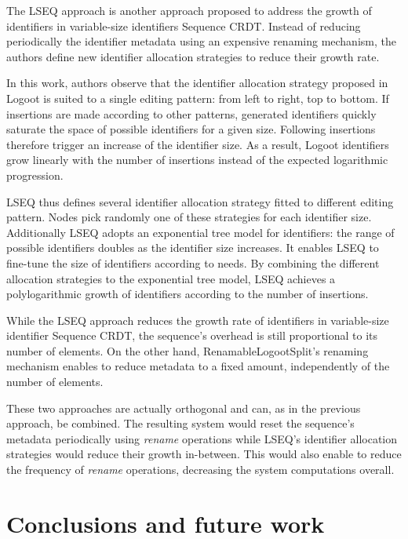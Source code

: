 \documentclass[10pt,journal,compsoc]{IEEEtran}
\begin{document}
The LSEQ approach \cite{lseq2013, lseq2017} is another approach proposed to address the growth of identifiers in variable-size identifiers Sequence \ac{CRDT}. Instead of reducing periodically the identifier metadata using an expensive renaming mechanism, the authors define new identifier allocation strategies to reduce their growth rate.

In this work, authors observe that the identifier allocation strategy proposed in Logoot\cite{WeissICDCS09} is suited to a single editing pattern: from left to right, top to bottom.
If insertions are made according to other patterns, generated identifiers quickly saturate the space of possible identifiers for a given size.
Following insertions therefore trigger an increase of the identifier size.
As a result, Logoot identifiers grow linearly with the number of insertions instead of the expected logarithmic progression.

LSEQ thus defines several identifier allocation strategy fitted to different editing pattern.
Nodes pick randomly one of these strategies for each identifier size.
Additionally LSEQ adopts an exponential tree model for identifiers: the range of possible identifiers doubles as the identifier size increases.
It enables LSEQ to fine-tune the size of identifiers according to needs.
By combining the different allocation strategies to the exponential tree model, LSEQ achieves a polylogarithmic growth of identifiers according to the number of insertions.

While the LSEQ approach reduces the growth rate of identifiers in variable-size identifier Sequence \ac{CRDT}, the sequence's overhead is still proportional to its number of elements.
On the other hand, RenamableLogootSplit's renaming mechanism enables to reduce metadata to a fixed amount, independently of the number of elements.

These two approaches are actually orthogonal and can, as in the previous approach, be combined.
The resulting system would reset the sequence's metadata periodically using \emph{rename} operations while LSEQ's identifier allocation strategies would reduce their growth in-between.
This would also enable to reduce the frequency of \emph{rename} operations, decreasing the system computations overall.

\section{Conclusions and future work}
\label{sec:conclusion}
\end{document}

